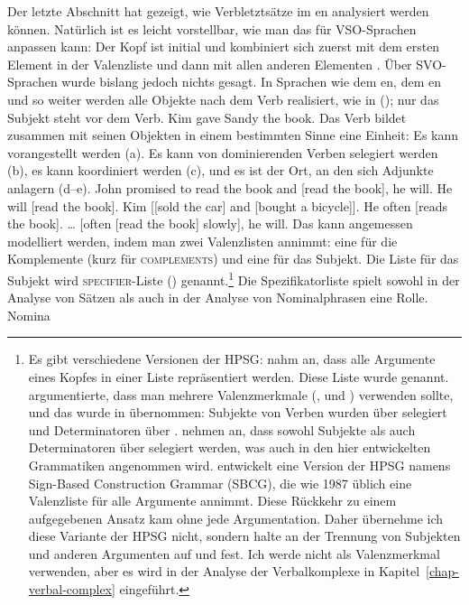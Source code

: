 Der letzte Abschnitt hat gezeigt, wie Verbletztsätze im en analysiert werden können. Natürlich ist es
leicht vorstellbar, wie man das für VSO-Sprachen anpassen kann: Der Kopf ist initial und kombiniert sich zuerst mit dem ersten
Element in der Valenzliste und dann mit allen anderen Elementen \citep[347--348]{Borsley89b}. Über SVO-Sprachen wurde bislang jedoch nichts
gesagt. In Sprachen wie dem en, dem en und so weiter werden alle Objekte
nach dem Verb realisiert, wie in (); nur das Subjekt steht vor dem Verb.
\ea
Kim gave Sandy the book.
\z
Das Verb bildet zusammen mit seinen Objekten in einem bestimmten Sinne eine Einheit: Es kann vorangestellt werden (a). Es kann von
dominierenden Verben selegiert werden (b), es kann koordiniert werden (c), und es ist der Ort, an den sich Adjunkte anlagern (d--e).
\eal
\ex John promised to read the book and [read the book], he will.
\ex He will [read the book].
\ex Kim [[sold the car] and [bought a bicycle]].
\ex He often [reads the book].
\ex \ldots{} [often [read the book] slowly], he will.
\zl
Das kann angemessen modelliert werden, indem man zwei Valenzlisten annimmt: eine für die Komplemente (\comps kurz für \textsc{complements}) und
eine für das Subjekt. Die Liste für das Subjekt wird \textsc{specifier}-Liste
(\spr) genannt.\footnote{%
  Es gibt verschiedene Versionen der HPSG: \citet[Abschnitt~3.2]{ps} nahm an, dass alle Argumente eines Kopfes
  in einer Liste repräsentiert werden. Diese Liste wurde \subcatl genannt. \citet{Borsley87a} argumentierte, dass man
  mehrere Valenzmerkmale (\subj, \spr und \comps) verwenden sollte, und das wurde in
   übernommen: Subjekte von Verben wurden über \subj{} selegiert und Determinatoren über
  \spr. \citet*[Abschnitt~4.3]{SWB2003a} nehmen an, dass sowohl Subjekte als auch Determinatoren über \spr selegiert werden, was
  auch in den hier entwickelten Grammatiken angenommen wird. \citet[Abschnitt~3.3]{Sag2012a} entwickelt eine Version der HPSG
  namens Sign-Based Construction Grammar (SBCG), die wie 1987 üblich eine Valenzliste für alle Argumente
  annimmt. Diese Rückkehr zu einem aufgegebenen Ansatz kam ohne jede Argumentation. Daher übernehme ich diese
  Variante der HPSG nicht, sondern halte an der Trennung von Subjekten und anderen Argumenten auf \spr und \comps fest. Ich
  werde \subj{} nicht als Valenzmerkmal verwenden, aber es wird in der Analyse der Verbalkomplexe
  in Kapitel~\ref{chap-verbal-complex} eingeführt.
} Die Spezifikatorliste spielt sowohl in der Analyse von Sätzen als auch in der Analyse von Nominalphrasen eine Rolle. Nomina
